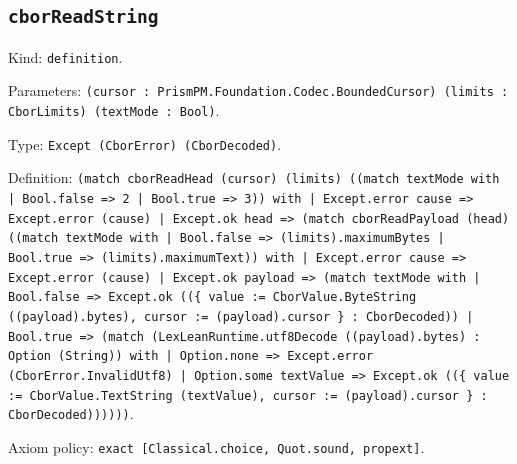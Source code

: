 \documentclass[11pt]{article}
\begin{document}
\subsection*{\texttt{cborReadString}}
\noindent Kind: \texttt{definition}.\par
\noindent Parameters: \texttt{(cursor : PrismPM.Foundation.Codec.BoundedCursor) (limits : CborLimits) (textMode : Bool)}.\par
\noindent Type: \texttt{Except (CborError) (CborDecoded)}.\par
\noindent Definition: \texttt{(match cborReadHead (cursor) (limits) ((match textMode with | Bool.false => 2 | Bool.true => 3)) with | Except.error cause => Except.error (cause) | Except.ok head => (match cborReadPayload (head) ((match textMode with | Bool.false => (limits).maximumBytes | Bool.true => (limits).maximumText)) with | Except.error cause => Except.error (cause) | Except.ok payload => (match textMode with | Bool.false => Except.ok ((\{ value := CborValue.ByteString ((payload).bytes), cursor := (payload).cursor \} : CborDecoded)) | Bool.true => (match (LexLeanRuntime.utf8Decode ((payload).bytes) : Option (String)) with | Option.none => Except.error (CborError.InvalidUtf8) | Option.some textValue => Except.ok ((\{ value := CborValue.TextString (textValue), cursor := (payload).cursor \} : CborDecoded))))))}.\par
\noindent Axiom policy: \texttt{exact [Classical.choice, Quot.sound, propext]}.\par
\end{document}
